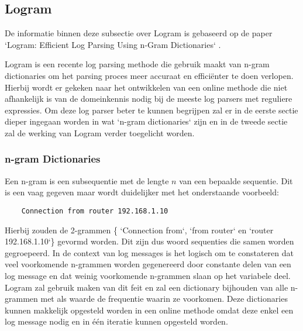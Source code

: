 \subsection{Logram}
De informatie binnen deze subsectie over Logram is gebaseerd op de paper `Logram: Efficient Log Parsing Using n-Gram Dictionaries` \autocite{dai2020logram}. 

Logram is een recente log parsing methode die gebruik maakt van n-gram dictionaries om het parsing proces meer accuraat en efficiënter te doen verlopen. Hierbij wordt er gekeken naar het ontwikkelen van een online methode die niet afhankelijk is van de domeinkennis nodig bij de meeste log parsers met reguliere expressies. Om deze log parser beter te kunnen begrijpen zal er in de eerste sectie dieper ingegaan worden in wat `n-gram dictionaries` zijn en in de tweede sectie zal de werking van Logram verder toegelicht worden.

\subsubsection{n-gram Dictionaries}
Een n-gram is een subsequentie met de lengte $n$ van een bepaalde sequentie. Dit is een vaag gegeven maar wordt duidelijker met het onderstaande voorbeeld:
\begin{verbatim}
    Connection from router 192.168.1.10
\end{verbatim}
Hierbij zouden de 2-grammen \{ `Connection from`,  `from router` en `router 192.168.1.10`\} gevormd worden. Dit zijn dus woord sequenties die samen worden gegroepeerd. In de context van log messages is het logisch om te constateren dat veel voorkomende n-grammen worden gegenereerd door constante delen van een log message en dat weinig voorkomende n-grammen slaan op het variabele deel. Logram zal gebruik maken van dit feit en zal een dictionary bijhouden van alle n-grammen met als waarde de frequentie waarin ze voorkomen. Deze dictionaries kunnen makkelijk opgesteld worden in een online methode omdat deze enkel een log message nodig en in één iteratie kunnen opgesteld worden.

